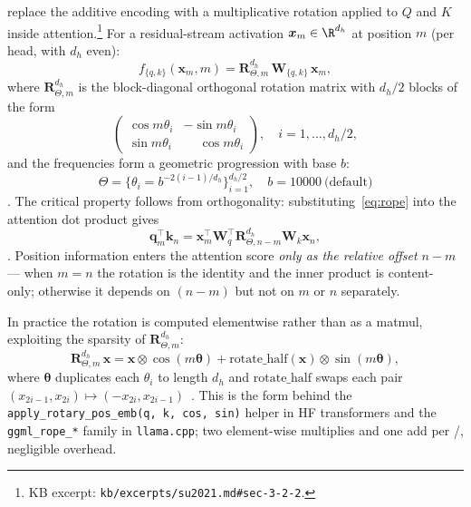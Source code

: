 \citet{su2021} replace the additive encoding with a multiplicative
rotation applied to $Q$ and $K$ inside attention.\footnote{KB excerpt:
\nolinkurl{kb/excerpts/su2021.md#sec-3-2-2}.} For a residual-stream
activation $\boldsymbol{x}_m \in \R^{d_h}$ at position $m$ (per head,
with $d_h$ even):
\begin{equation}
f_{\{q,k\}}(\boldsymbol{x}_m, m)
= \boldsymbol{R}^{d_h}_{\Theta, m}\, \boldsymbol{W}_{\{q,k\}}\, \boldsymbol{x}_m,
\label{eq:rope}
\end{equation}
where $\boldsymbol{R}^{d_h}_{\Theta, m}$ is the block-diagonal
orthogonal rotation matrix with $d_h/2$ blocks of the form
\begin{equation}
\begin{pmatrix}\cos m\theta_i & -\sin m\theta_i \\
               \sin m\theta_i & \phantom{-}\cos m\theta_i\end{pmatrix},
\quad i = 1, \ldots, d_h/2,
\label{eq:rope-block}
\end{equation}
and the frequencies form a geometric progression with base $b$:
\begin{equation}
\Theta = \bigl\{\theta_i = b^{-2(i-1)/d_h}\bigr\}_{i=1}^{d_h/2},
\quad b = 10000\ \text{(default)}
\label{eq:rope-theta}
\end{equation}
\citep[\S 3.2.2 Eq.\ 14--15]{su2021}. The critical property follows
from orthogonality: substituting~\eqref{eq:rope}
into the attention dot product gives
\begin{equation}
\boldsymbol{q}_m^\top \boldsymbol{k}_n
= \boldsymbol{x}_m^\top \boldsymbol{W}_q^\top
  \boldsymbol{R}^{d_h}_{\Theta, n - m} \boldsymbol{W}_k
  \boldsymbol{x}_n,
\label{eq:rope-relative}
\end{equation}
\citep[\S 3.2.2 Eq.\ 16]{su2021}. Position information enters the
attention score \emph{only as the relative offset $n-m$} --- when
$m = n$ the rotation is the identity and the inner product is content-
only; otherwise it depends on $(n-m)$ but not on $m$ or $n$ separately.

In practice the rotation is computed elementwise rather than as a
matmul, exploiting the sparsity of $\boldsymbol{R}^{d_h}_{\Theta, m}$:
\begin{equation}
\boldsymbol{R}^{d_h}_{\Theta, m}\, \boldsymbol{x}
= \boldsymbol{x} \otimes \cos(m\boldsymbol{\theta})
  + \mathrm{rotate\_half}(\boldsymbol{x}) \otimes \sin(m\boldsymbol{\theta}),
\label{eq:rope-pair}
\end{equation}
where $\boldsymbol{\theta}$ duplicates each $\theta_i$ to length $d_h$
and $\mathrm{rotate\_half}$ swaps each pair
$(x_{2i-1}, x_{2i}) \mapsto (-x_{2i}, x_{2i-1})$~\citep[\S 3.4.2 Eq.\ 34]{su2021}.
This is the form behind the
\texttt{apply\_rotary\_pos\_emb(q, k, cos, sin)} helper in HF
transformers and the \texttt{ggml\_rope\_*} family in \texttt{llama.cpp};
two element-wise multiplies and one add per /, negligible
overhead.

